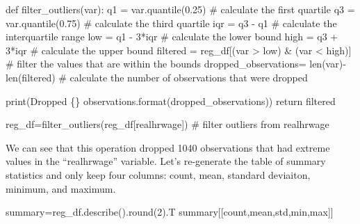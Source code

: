 \documentclass[
  letterpaper,
  DIV=11,
  numbers=noendperiod]{scrreprt}
\newenvironment{Shaded}{\begin{snugshade}}{\end{snugshade}}
\newcommand{\BuiltInTok}[1]{\textcolor[rgb]{0.00,0.23,0.31}{#1}}
\newcommand{\CommentTok}[1]{\textcolor[rgb]{0.37,0.37,0.37}{#1}}
\newcommand{\ControlFlowTok}[1]{\textcolor[rgb]{0.00,0.23,0.31}{#1}}
\newcommand{\DecValTok}[1]{\textcolor[rgb]{0.68,0.00,0.00}{#1}}
\newcommand{\FloatTok}[1]{\textcolor[rgb]{0.68,0.00,0.00}{#1}}
\newcommand{\KeywordTok}[1]{\textcolor[rgb]{0.00,0.23,0.31}{#1}}
\newcommand{\NormalTok}[1]{\textcolor[rgb]{0.00,0.23,0.31}{#1}}
\newcommand{\OperatorTok}[1]{\textcolor[rgb]{0.37,0.37,0.37}{#1}}
\newcommand{\SpecialCharTok}[1]{\textcolor[rgb]{0.37,0.37,0.37}{#1}}
\newcommand{\StringTok}[1]{\textcolor[rgb]{0.13,0.47,0.30}{#1}}
\begin{document}
\begin{Shaded}
\begin{Highlighting}[]
\KeywordTok{def}\NormalTok{ filter\_outliers(var):}
\NormalTok{    q1 }\OperatorTok{=}\NormalTok{ var.quantile(}\FloatTok{0.25}\NormalTok{) }\CommentTok{\# calculate the first quartile}
\NormalTok{    q3 }\OperatorTok{=}\NormalTok{ var.quantile(}\FloatTok{0.75}\NormalTok{) }\CommentTok{\# calculate the third quartile}
\NormalTok{    iqr }\OperatorTok{=}\NormalTok{ q3 }\OperatorTok{{-}}\NormalTok{ q1 }\CommentTok{\# calculate the interquartile range}
\NormalTok{    low }\OperatorTok{=}\NormalTok{ q1 }\OperatorTok{{-}} \DecValTok{3}\OperatorTok{*}\NormalTok{iqr }\CommentTok{\# calculate the lower bound}
\NormalTok{    high }\OperatorTok{=}\NormalTok{ q3 }\OperatorTok{+} \DecValTok{3}\OperatorTok{*}\NormalTok{iqr }\CommentTok{\# calculate the upper bound}
\NormalTok{    filtered }\OperatorTok{=}\NormalTok{ reg\_df[(var }\OperatorTok{\textgreater{}}\NormalTok{ low) }\OperatorTok{\&}\NormalTok{ (var }\OperatorTok{\textless{}}\NormalTok{ high)] }\CommentTok{\# filter  the values that are within the bounds}
\NormalTok{    dropped\_observations}\OperatorTok{=} \BuiltInTok{len}\NormalTok{(var)}\OperatorTok{{-}}\BuiltInTok{len}\NormalTok{(filtered) }\CommentTok{\# calculate the number of observations that were dropped}

    \BuiltInTok{print}\NormalTok{(}\StringTok{\textquotesingle{}Dropped }\SpecialCharTok{\{\}}\StringTok{ observations\textquotesingle{}}\NormalTok{.}\BuiltInTok{format}\NormalTok{(dropped\_observations))}
    \ControlFlowTok{return}\NormalTok{  filtered}

\NormalTok{reg\_df}\OperatorTok{=}\NormalTok{filter\_outliers(reg\_df[}\StringTok{\textquotesingle{}realhrwage\textquotesingle{}}\NormalTok{]) }\CommentTok{\# filter outliers from realhrwage}
\end{Highlighting}
\end{Shaded}

We can see that this operation dropped 1040 observations that had
extreme values in the ``realhrwage'' variable. Let's re-generate the
table of summary statistics and only keep four columns: count, mean,
standard deviaiton, minimum, and maximum.

\begin{Shaded}
\begin{Highlighting}[]
\NormalTok{summary}\OperatorTok{=}\NormalTok{reg\_df.describe().}\BuiltInTok{round}\NormalTok{(}\DecValTok{2}\NormalTok{).T}
\NormalTok{summary[[}\StringTok{\textquotesingle{}count\textquotesingle{}}\NormalTok{,}\StringTok{\textquotesingle{}mean\textquotesingle{}}\NormalTok{,}\StringTok{\textquotesingle{}std\textquotesingle{}}\NormalTok{,}\StringTok{\textquotesingle{}min\textquotesingle{}}\NormalTok{,}\StringTok{\textquotesingle{}max\textquotesingle{}}\NormalTok{]]}
\end{Highlighting}
\end{Shaded}
\end{document}
